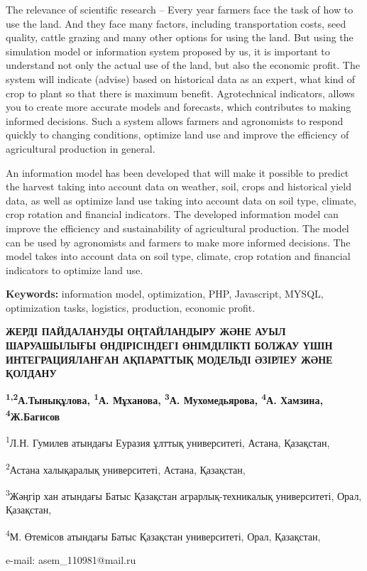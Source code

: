 The relevance of scientific research -- Every year farmers face the task
of how to use the land. And they face many factors, including
transportation costs, seed quality, cattle grazing and many other
options for using the land. But using the simulation model or
information system proposed by us, it is important to understand not
only the actual use of the land, but also the economic profit. The
system will indicate (advise) based on historical data as an expert,
what kind of crop to plant so that there is maximum benefit.
Agrotechnical indicators, allows you to create more accurate models and
forecasts, which contributes to making informed decisions. Such a system
allows farmers and agronomists to respond quickly to changing
conditions, optimize land use and improve the efficiency of agricultural
production in general.

An information model has been developed that will make it possible to
predict the harvest taking into account data on weather, soil, crops and
historical yield data, as well as optimize land use taking into account
data on soil type, climate, crop rotation and financial indicators. The
developed information model can improve the efficiency and
sustainability of agricultural production. The model can be used by
agronomists and farmers to make more informed decisions. The model takes
into account data on soil type, climate, crop rotation and financial
indicators to optimize land use.

{\bfseries Keywords:} information model, optimization, PHP, Javascript,
MYSQL, optimization tasks, logistics, production, economic profit.
\newpage
\begin{center}
{\large\bfseries ЖЕРДІ ПАЙДАЛАНУДЫ ОҢТАЙЛАНДЫРУ ЖӘНЕ АУЫЛ ШАРУАШЫЛЫҒЫ
ӨНДІРІСІНДЕГІ ӨНІМДІЛІКТІ БОЛЖАУ ҮШІН ИНТЕГРАЦИЯЛАНҒАН АҚПАРАТТЫҚ
МОДЕЛЬДІ ӘЗІРЛЕУ ЖӘНЕ ҚОЛДАНУ}

{\bfseries \textsuperscript{1,2}А.Тынықұлова, \textsuperscript{1}А.
Мұханова, \textsuperscript{3}А. Мухомедьярова, \textsuperscript{4}А.
Хамзина, \textsuperscript{4}Ж.Багисов}

\textsuperscript{1}Л.Н. Гумилев атындағы Еуразия ұлттық университеті,
Астана, Қазақстан,

\textsuperscript{2}Астана халықаралық университеті, Астана, Қазақстан,

\textsuperscript{3}Жәңгір хан атындағы Батыс Қазақстан
аграрлық-техникалық университеті, Орал, Қазақстан,

\textsuperscript{4}М. Өтемісов атындағы Батыс Қазақстан университеті,
Орал, Қазақстан,

e-mail: asem\_110981@mail.ru
\end{center}

